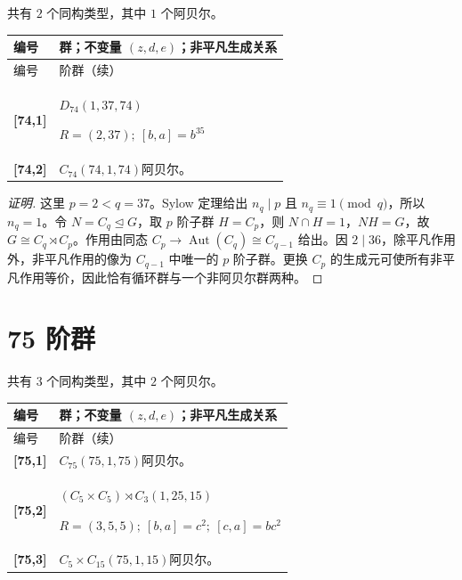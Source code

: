 \documentclass[UTF8,fontset=fandol,11pt,a4paper]{ctexart}
\newcommand{\Aut}{\operatorname{Aut}}\newcommand{\GL}{\operatorname{GL}}\newcommand{\ord}{\operatorname{ord}}\newcommand{\Z}{\mathrm Z}
\begin{document}
共有 $2$ 个同构类型，其中 $1$ 个阿贝尔。

\begingroup\small\setlength{\tabcolsep}{3pt}\renewcommand{\arraystretch}{1.12}

\begin{longtable}{@{}p{17mm}>{\raggedright\arraybackslash}p{141mm}@{}}

\toprule 编号 & 群；不变量 $(z,d,e)$；非平凡生成关系\\\midrule\endfirsthead

\toprule 编号 & 74 阶群（续）\\\midrule\endhead\bottomrule\endfoot

\textbf{[74,1]} & $D_{74}$\quad $(1,37,74)$\par\(R=(2,37);\allowbreak\ [b,a]=b^{35}\)\\[3pt]

\textbf{[74,2]} & $C_{74}$\quad $(74,1,74)$\quad 阿贝尔。\\[3pt]

\end{longtable}\endgroup

\begin{proof}[证明]
这里 $p=2<q=37$。Sylow 定理给出 $n_q\mid p$ 且 $n_q\equiv1\pmod q$，所以 $n_q=1$。令 $N=C_q\trianglelefteq G$，取 $p$ 阶子群 $H=C_p$，则 $N\cap H=1$，$NH=G$，故 $G\cong C_q\rtimes C_p$。作用由同态 $C_p\to\Aut(C_q)\cong C_{q-1}$ 给出。因 $2\mid 36$，除平凡作用外，非平凡作用的像为 $C_{q-1}$ 中唯一的 $p$ 阶子群。更换 $C_p$ 的生成元可使所有非平凡作用等价，因此恰有循环群与一个非阿贝尔群两种。
\end{proof}

\section*{75 阶群}\label{order:75}

共有 $3$ 个同构类型，其中 $2$ 个阿贝尔。

\begingroup\small\setlength{\tabcolsep}{3pt}\renewcommand{\arraystretch}{1.12}

\begin{longtable}{@{}p{17mm}>{\raggedright\arraybackslash}p{141mm}@{}}

\toprule 编号 & 群；不变量 $(z,d,e)$；非平凡生成关系\\\midrule\endfirsthead

\toprule 编号 & 75 阶群（续）\\\midrule\endhead\bottomrule\endfoot

\textbf{[75,1]} & $C_{75}$\quad $(75,1,75)$\quad 阿贝尔。\\[3pt]

\textbf{[75,2]} & $(C_{5}\times C_{5})\rtimes C_{3}$\quad $(1,25,15)$\par\(R=(3,5,5);\allowbreak\ [b,a]=c^{2};\allowbreak\ [c,a]=bc^{2}\)\\[3pt]

\textbf{[75,3]} & $C_{5}\times C_{15}$\quad $(75,1,15)$\quad 阿贝尔。\\[3pt]

\end{longtable}\endgroup
\end{document}
